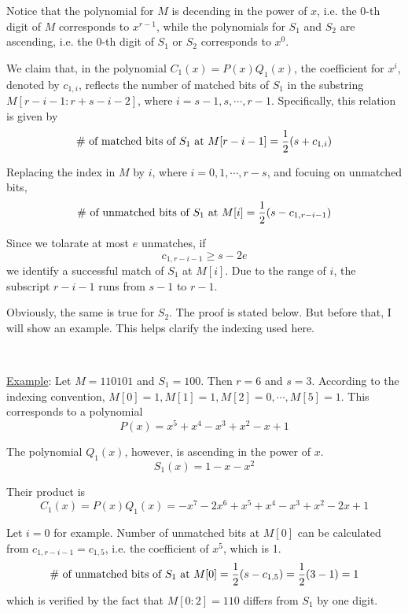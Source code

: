 \documentclass{article}
\begin{document}
Notice that the polynomial for $M$ is decending in the power of $x$, i.e. the 0-th digit of $M$ corresponds to $x^{r-1}$, while the polynomials for $S_1$ and $S_2$ are ascending, i.e. the 0-th digit of $S_1$ or $S_2$ corresponds to $x^0$.

We claim that, in the polynomial $C_1(x)=P(x)Q_1(x)$, the coefficient for $x^i$, denoted by $c_{1,i}$, reflects the number of matched bits of $S_1$ in the substring $M[r-i-1:r+s-i-2]$, where $i=s-1,s,\cdots,r-1$. Specifically, this relation is given by
\begin{equation*}
\textup{\# of matched bits of $S_1$ at $M[r-i-1]$}=\frac{1}{2}(s+c_{1,i})
\end{equation*}

Replacing the index in $M$ by $i$, where $i=0,1,\cdots,r-s$, and focuing on unmatched bits,
\begin{equation*}
\textup{\# of unmatched bits of $S_1$ at $M[i]$}=\frac{1}{2}(s-c_{1,r-i-1})
\end{equation*}

Since we tolarate at most $e$ unmatches, if
\begin{equation*}
c_{1,r-i-1}\geqslant s-2e
\end{equation*}
we identify a successful match of $S_1$ at $M[i]$. Due to the range of $i$, the subscript $r-i-1$ runs from $s-1$ to $r-1$.

Obviously, the same is true for $S_2$. The proof is stated below. But before that, I will show an example. This helps clarify the indexing used here.

~

\noindent\underline{Example}: Let $M=110101$ and $S_1=100$. Then $r=6$ and $s=3$. According to the indexing convention, $M[0]=1,M[1]=1,M[2]=0,\cdots,M[5]=1$. This corresponds to a polynomial
\begin{equation*}
P(x)=x^5+x^4-x^3+x^2-x+1
\end{equation*}

The polynomial $Q_1(x)$, however, is ascending in the power of $x$.
\begin{equation*}
S_1(x)=1-x-x^2
\end{equation*}

Their product is
\begin{equation*}
C_1(x)=P(x)Q_1(x)=-x^7-2x^6+x^5+x^4-x^3+x^2-2x+1
\end{equation*}

Let $i=0$ for example. Number of unmatched bits at $M[0]$ can be calculated from $c_{1,r-i-1}=c_{1,5}$, i.e. the coefficient of $x^5$, which is 1.
\begin{equation*}
\textup{\# of unmatched bits of $S_1$ at $M[0]$}=\frac{1}{2}(s-c_{1,5})=\frac{1}{2}(3-1)=1
\end{equation*}
which is verified by the fact that $M[0:2]=110$ differs from $S_1$ by one digit.
\end{document}
